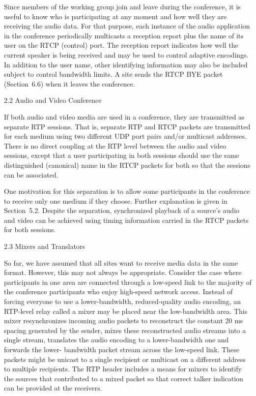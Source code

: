 \documentclass{article}
\begin{document}
Since members of the working group join and leave during the conference, it is useful to know who is participating at any moment and how well they are receiving the audio data.  For that purpose, each instance of the audio application in the conference periodically multicasts a reception report plus the name of its user on the RTCP (control) port.  The reception report indicates how well the current speaker is being received and may be used to control adaptive encodings.  In addition to the user name, other identifying information may also be included subject to control bandwidth limits. A site sends the RTCP BYE packet (Section~6.6) when it leaves the conference.

2.2 Audio and Video Conference

If both audio and video media are used in a conference, they are transmitted as separate RTP sessions.  That is, separate RTP and RTCP packets are transmitted for each medium using two different UDP port pairs and/or multicast addresses.  There is no direct coupling at the RTP level between the audio and video sessions, except that a user participating in both sessions should use the same distinguished (canonical) name in the RTCP packets for both so that the sessions can be associated.

One motivation for this separation is to allow some participants in the conference to receive only one medium if they choose.  Further explanation is given in Section~5.2.  Despite the separation, synchronized playback of a source's audio and video can be achieved using timing information carried in the RTCP packets for both sessions.

2.3 Mixers and Translators

So far, we have assumed that all sites want to receive media data in the same format.  However, this may not always be appropriate. Consider the case where participants in one area are connected through a low-speed link to the majority of the conference participants who enjoy high-speed network access.  Instead of forcing everyone to use a lower-bandwidth, reduced-quality audio encoding, an RTP-level relay called a mixer may be placed near the low-bandwidth area.  This mixer resynchronizes incoming audio packets to reconstruct the constant 20 ms spacing generated by the sender, mixes these reconstructed audio streams into a single stream, translates the audio encoding to a lower-bandwidth one and forwards the lower- bandwidth packet stream across the low-speed link.  These packets might be unicast to a single recipient or multicast on a different address to multiple recipients.  The RTP header includes a means for mixers to identify the sources that contributed to a mixed packet so that correct talker indication can be provided at the receivers.
\end{document}
